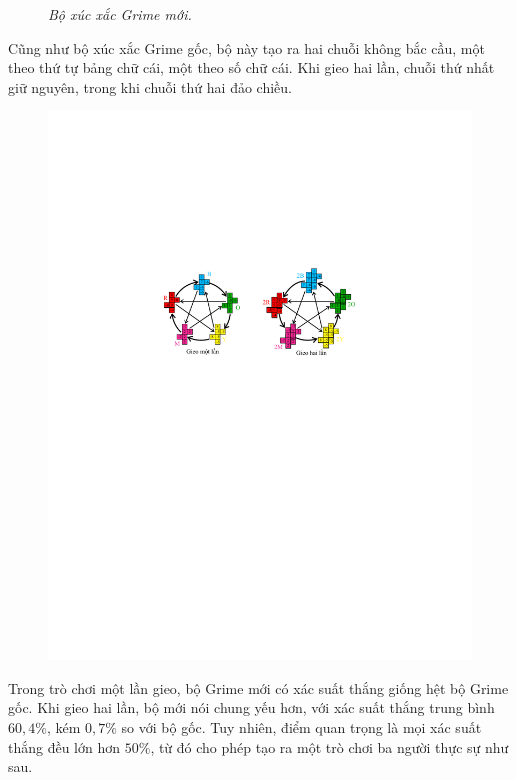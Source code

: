 \begin{multicols}{2}
\begin{figure}[H]
		\caption{\small\textit{\color{quantoan}Bộ xúc xắc Grime mới.}}
		\vspace*{-15pt}
	\end{figure}
	Cũng như bộ xúc xắc Grime gốc, bộ này tạo ra hai chuỗi không bắc cầu, một theo thứ tự bảng chữ cái, một theo số chữ cái. Khi gieo hai lần, chuỗi thứ nhất giữ nguyên, trong khi chuỗi thứ hai đảo chiều.
	\begin{figure}[H]
		\vspace*{-10pt}
		\centering
		\captionsetup{labelformat= empty, justification=centering}
		\includegraphics[width=1\linewidth]{15}
		\vspace*{-20pt}
	\end{figure}
	Trong trò chơi một lần gieo, bộ Grime mới có xác suất thắng giống hệt bộ Grime gốc. Khi gieo hai lần, bộ mới nói chung yếu hơn, với xác suất thắng trung bình $60{,}4\%$, kém $0{,}7\%$ so với bộ gốc. Tuy nhiên, điểm quan trọng là mọi xác suất thắng đều lớn hơn $50\%$, từ đó cho phép tạo ra một trò chơi ba người thực sự như sau.

\end{multicols}

